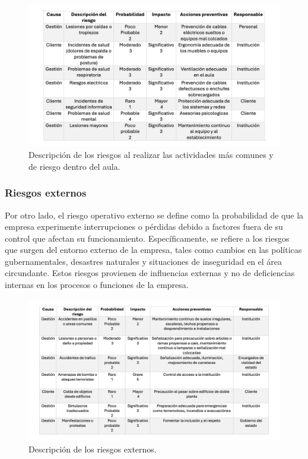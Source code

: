 \begin{figure}[H]
    \centering
    \includegraphics[scale=0.181]{15/img/talaRiesgosInternos.pdf}
    \caption{Descripción de los riesgos al realizar las actividades más comunes y de riesgo dentro del aula.}
    \label{fig:tablaRiesgosInternos}
\end{figure}

% 
\subsubsection{Riesgos externos}
% 
Por otro lado, el riesgo operativo externo se define como la probabilidad de que la empresa experimente interrupciones o pérdidas debido a factores fuera de su control que afectan su funcionamiento. Específicamente, se refiere a los riesgos que surgen del entorno externo de la empresa, tales como cambios en las políticas gubernamentales, desastres naturales y situaciones de inseguridad en el área circundante. Estos riesgos provienen de influencias externas y no de deficiencias internas en los procesos o funciones de la empresa.

\begin{figure}[H]
    \centering
    \includegraphics[scale=0.17]{15/img/talaRiesgosExternos.pdf}
    \caption{Descripción de los riesgos externos.}
    \label{fig:tablaRiesgosExternos}
\end{figure}


